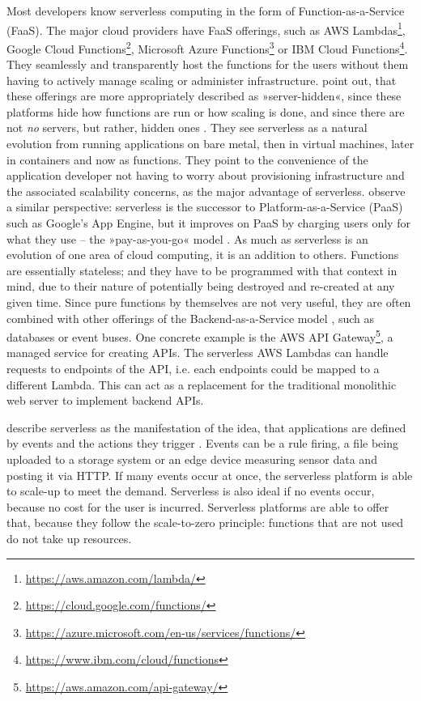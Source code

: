 Most developers know serverless computing in the form of Function-as-a-Service (FaaS). The major cloud providers have FaaS offerings, such as AWS Lambdas\footnote{\url{https://aws.amazon.com/lambda/}}, Google Cloud Functions\footnote{\url{https://cloud.google.com/functions/}}, Microsoft Azure Functions\footnote{\url{https://azure.microsoft.com/en-us/services/functions/}} or IBM Cloud Functions\footnote{\url{https://www.ibm.com/cloud/functions}}. They seamlessly and transparently host the functions for the users without them having to actively manage scaling or administer infrastructure. \citeauthor{Fox2017} point out, that these offerings are more appropriately described as »server-hidden«, since these platforms hide how functions are run or how scaling is done, and since there are not \emph{no} servers, but rather, hidden ones \cite{Fox2017}. They see serverless as a natural evolution from running applications on bare metal, then in virtual machines, later in containers and now as functions. They point to the convenience of the application developer not having to worry about provisioning infrastructure and the associated scalability concerns, as the major advantage of serverless. \citeauthor{Castro2019} observe a similar perspective: serverless is the successor to Platform-as-a-Service (PaaS) such as Google's App Engine, but it improves on PaaS by charging users only for what they use -- the »pay-as-you-go« model \cite{Castro2019}.
As much as serverless is an evolution of one area of cloud computing, it is an addition to others. Functions are essentially stateless; and they have to be programmed with that context in mind, due to their nature of potentially being destroyed and re-created at any given time. Since pure functions by themselves are not very useful, they are often combined with other offerings of the Backend-as-a-Service model \cite{Eismann2021}, such as databases or event buses. One concrete example is the AWS API Gateway\footnote{\url{https://aws.amazon.com/api-gateway/}}, a managed service for creating APIs. The serverless AWS Lambdas can handle requests to endpoints of the API, i.e. each endpoints could be mapped to a different Lambda. This can act as a replacement for the traditional monolithic web server to implement backend APIs.

\citeauthor{McGrath2017} describe serverless as the manifestation of the idea, that applications are defined by events and the actions they trigger \cite{McGrath2017}. Events can be a rule firing, a file being uploaded to a storage system or an edge device measuring sensor data and posting it via HTTP. If many events occur at once, the serverless platform is able to scale-up to meet the demand. Serverless is also ideal if no events occur, because no cost for the user is incurred. Serverless platforms are able to offer that, because they follow the scale-to-zero principle: functions that are not used do not take up resources.

